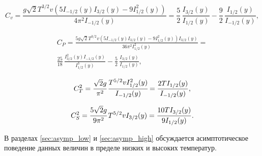 \begin{equation}
   \label{eq:C_v}
   C_v = \frac{g\sqrt{2} T^{3 /2} v \left( 5 I_{-1 / 2 } (y) I_{3 /2} (y) - 9 I_{1 / 2}^2 (y)\right)}{4\pi^2 I_{-1 / 2} (y)}
   = \frac{5}{2}\,\frac{I_{3/2}(y)}{I_{1/2}(y)} - \frac{9}{2}\,\frac{I_{1/2}(y)}{I_{-1/2}(y)},
\end{equation}

\begin{multline}
   \label{eq:C_P}
      C_{P} = \frac{5 g \sqrt{2} T^{3 / 2} v\left(5 I_{-1 / 2}(y) I_{3 / 2}(y)-9 I_{1 / 2}^{2}(y)\right) I_{3 / 2}(y)}{36 \pi^{2} I_{1 / 2}^{2}(y)}
      = {}\\
      \frac{25}{18}\,\frac{I^2_{3/2}(y)I_{-1/2}(y)}{I^3_{1/2}(y)} - \frac{5}{2}\,\frac{I_{3/2}(y)}{I_{1/2}(y)},
\end{multline}

\begin{equation}
   \label{eq:C_T}
   C_{T}^2 = \cfrac{\sqrt{2}g}{\pi^2}\,  \cfrac{T^{5 /2} v I_{1 / 2}^2 (y)}{I_{-1 / 2} (y)}
   = \frac{2TI_{1/2}(y)}{I_{-1/2}(y)},
\end{equation}

\begin{equation}
   \label{eq:C_S}
   C_{S}^2 = \cfrac{5 \sqrt{2}g}{9 \pi^2}\, T^{5 / 2} v I_{3 / 2} (y)
   = \frac{10T I_{3/2}(y)}{9I_{1/2}(y)}.
\end{equation}

В разделах \ref{sec:asymp_low} и \ref{sec:asymp_high} обсуждается асимптотическое поведение данных величин в пределе низких и высоких температур.

